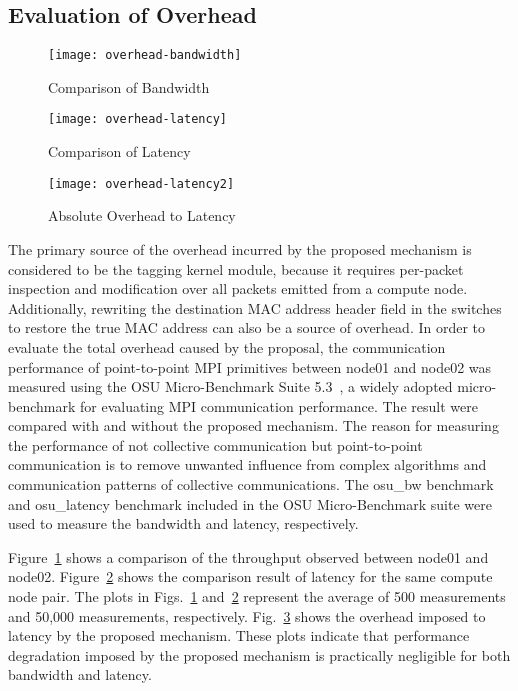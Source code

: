 \subsection{Evaluation of Overhead}

\begin{figure}
    \centering
    \texttt{[image: overhead-bandwidth]}
    \caption{Comparison of Bandwidth}%
    \label{fig:overhead-bandwidth}
\end{figure}

\begin{figure}
    \centering
    \texttt{[image: overhead-latency]}
    \caption{Comparison of Latency}%
    \label{fig:overhead-latency}
\end{figure}

\begin{figure}
    \centering
    \texttt{[image: overhead-latency2]}
    \caption{Absolute Overhead to Latency}
    \label{fig:overhead-latency-2}
\end{figure}

The primary source of the overhead incurred by the proposed mechanism is
considered to be the tagging kernel module, because it requires
per-packet inspection and modification over all packets emitted from a
compute node. Additionally, rewriting the destination MAC address
header field in the switches to restore the true MAC address can also be
a source of overhead. In order to evaluate the total overhead caused by
the proposal, the communication performance of point-to-point MPI primitives
between node01 and node02 was measured using the OSU Micro-Benchmark Suite
5.3~\autocite{omb}, a widely adopted micro-benchmark for evaluating MPI
communication performance. The result were compared  with and without the
proposed mechanism. The reason for measuring the performance of not collective
communication but point-to-point communication is to remove unwanted influence
from complex algorithms and communication patterns of collective
communications. The osu\_bw benchmark and osu\_latency benchmark included in
the OSU Micro-Benchmark suite were used to measure the bandwidth and latency,
respectively.

Figure~\ref{fig:overhead-bandwidth} shows a comparison of the throughput
observed between node01 and node02. Figure~\ref{fig:overhead-latency} shows
the comparison result of latency for the same compute node pair. The plots in
Figs.~\ref{fig:overhead-bandwidth} and~\ref{fig:overhead-latency} represent
the average of 500 measurements and 50,000 measurements, respectively.
Fig.~\ref{fig:overhead-latency-2} shows the overhead imposed to latency by the
proposed mechanism. These plots indicate that performance degradation imposed
by the proposed mechanism is practically negligible for both bandwidth and
latency.

